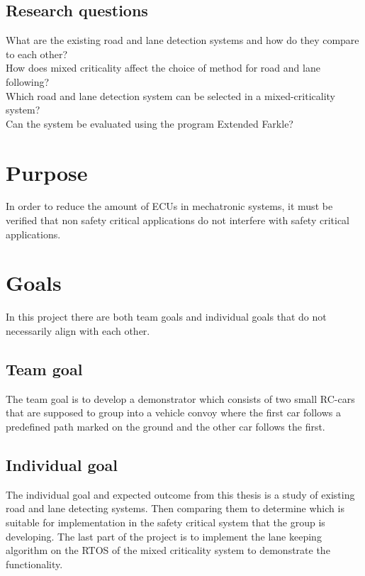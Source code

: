 \subsection{Research questions}
What are the existing road and lane detection systems and how do they compare to each other?\\

How does mixed criticality affect the choice of method for road and lane following?\\

Which road and lane detection system can be selected in a mixed-criticality system?\\

Can the system be evaluated using the program Extended Farkle?

\section{Purpose}
In order to reduce the amount of ECUs in mechatronic systems, it must be verified that non safety critical applications do not interfere with safety critical applications.

\section{Goals}
In this project there are both team goals and individual goals that do not necessarily align with each other.

\subsection{Team goal}
The team goal is to develop a demonstrator which consists of two small RC-cars that are supposed to group into a vehicle convoy where the first car follows a predefined path marked on the ground and the other car follows the first.

\subsection{Individual goal}
The individual goal and expected outcome from this thesis is a study of existing road and lane detecting systems. Then comparing them to determine which is suitable for implementation in the safety critical system that the group is developing. The last part of the project is to implement the lane keeping algorithm on the RTOS of the mixed criticality system to demonstrate the functionality.

